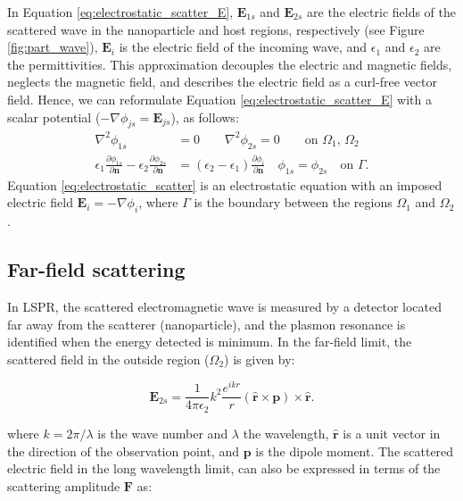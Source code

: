In Equation \eqref{eq:electrostatic_scatter_E}, $\mathbf{E}_{1s}$ and $\mathbf{E}_{2s}$ 
are the electric fields of the scattered wave in the nanoparticle and host regions, respectively 
(see Figure \ref{fig:part_wave}), $\mathbf{E}_{i}$ is the electric field of the incoming wave, and $\epsilon_1$ 
and $\epsilon_2$ are the permittivities. This approximation decouples the electric and magnetic fields, neglects the magnetic field, 
and describes the electric field as a curl-free vector field. Hence, we can reformulate Equation \eqref{eq:electrostatic_scatter_E} with a scalar potential
($-\nabla \phi_{js} = \mathbf{E}_{js}$), as follows:
%
\begin{align} \label{eq:electrostatic_scatter}
\nabla^2 \phi_{1s} &= 0 \qquad \nabla^2 \phi_{2s} = 0 \qquad\text{on $\Omega_1$, $\Omega_2$} \nonumber \\
\epsilon_1\frac{\partial\phi_{1s}}{\partial \mathbf{n}} - \epsilon_2\frac{\partial\phi_{2s}}{\partial\mathbf{n}} &= (\epsilon_2-\epsilon_1)\frac{\partial\phi_i}{\partial\mathbf{n}} \quad \phi_{1s} = \phi_{2s} \quad \text{on $\Gamma$}.
\end{align}
%
Equation \eqref{eq:electrostatic_scatter} is an electrostatic equation with an imposed electric
field $\mathbf{E}_i=-\nabla\phi_i$, where $\Gamma$ is the boundary between the regions $\Omega_1$ and $\Omega_2$.

\subsection{Far-field scattering} \label{sec:ff_scattering}

In LSPR, the scattered electromagnetic wave is measured by a detector located far away 
from the scatterer (nanoparticle), and the plasmon resonance is identified when the energy 
detected is minimum. In the far-field limit, the scattered field
in the outside region ($\Omega_2$) is given by: 

\begin{equation} \label{eq:scat_efield_long_range}
    \mathbf{E}_{2s} = \frac{1}{4\pi\epsilon_2}k^2\frac{e^{ikr}}{r} (\mathbf{\hat{r}} \times \mathbf{p})\times\mathbf{\hat{r}}.
\end{equation} 

where $k=2\pi/\lambda$ is the wave number and $\lambda$ the wavelength, $\mathbf{\hat{r}}$ 
is a unit vector in the direction of the observation point, and $\mathbf{p}$ is
the dipole moment. 
The scattered electric field in the long wavelength limit, can also be expressed in terms of the 
scattering amplitude $\mathbf{F}$ \cite{Jackson} as:


